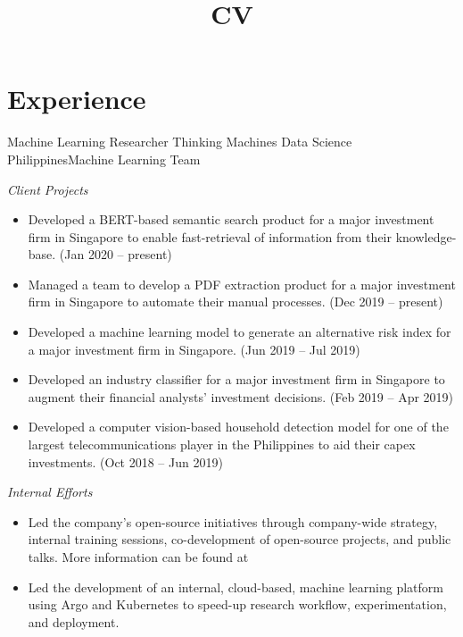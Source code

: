 \documentclass[12pt,a4paper]{moderncv}
\title{CV}
\begin{document}
\maketitle

\section{Experience}
{Machine Learning Researcher}
{Thinking Machines Data Science}
{Philippines}{Machine Learning Team}
{
    \vspace{3px}
    \textit{Client Projects}
    \begin{itemize}
        \item Developed a BERT-based semantic search product for a major
            investment firm in Singapore to enable fast-retrieval of
            information from their knowledge-base.
            (Jan 2020 -- present)
        \item Managed a team to develop a PDF extraction product for a major
            investment firm in Singapore to automate their manual processes.
            (Dec 2019 -- present)
        \item Developed a machine learning model to generate an alternative
            risk index for a major investment firm in Singapore. (Jun 2019 --
            Jul 2019)
        \item Developed an industry classifier for a major investment firm in
            Singapore to augment their financial analysts' investment
            decisions. (Feb 2019 -- Apr 2019)
        \item Developed a computer vision-based household detection model for
            one of the largest telecommunications player in the Philippines to
            aid their capex investments. (Oct 2018 -- Jun 2019)
    \end{itemize}
    \vspace{3px}
    \textit{Internal Efforts}
    \begin{itemize}
        \item Led the company's open-source initiatives through
            company-wide strategy, internal training sessions, co-development
            of open-source projects, and public talks. More information can be
            found at {\color{blue}
            }
        \item Led the development of an internal, cloud-based, machine learning
            platform using Argo and Kubernetes to speed-up research workflow,
            experimentation, and deployment.
    \end{itemize}
}
\end{document}
